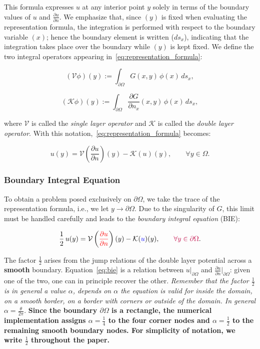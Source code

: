 \documentclass[11pt,onecolumn]{article}
\begin{document}
This formula expresses $u$ at any interior point $y$ solely in terms of the boundary values of $u$ and $\frac{\partial u}{\partial n}$. We emphasize that, since $(y)$ is fixed when evaluating the representation formula, the integration is performed with respect to the boundary variable $(x)$; hence the boundary element is written ($ds_{x}$), indicating that the integration takes place over the boundary while $(y)$ is kept fixed. We define the two integral operators appearing in~\eqref{eq:representation_formula}:

\begin{equation}
(\mathcal{V}\phi)(y) := \int_{\partial\Omega} G(x,y)\, \phi(x)\, ds_x,
\label{eq:single_layer}
\end{equation}

\begin{equation}
(\mathcal{K}\phi)(y) := \int_{\partial\Omega} \frac{\partial G}{\partial n_x}(x,y)\, \phi(x)\, ds_x,
\label{eq:double_layer}
\end{equation}

where $\mathcal{V}$ is called the \textit{single layer operator} and $\mathcal{K}$ is called the \textit{double layer operator}. With this notation,~\eqref{eq:representation_formula} becomes:

\begin{equation}
u(y) = \mathcal{V}\left(\frac{\partial u}{\partial n}\right)(y) - \mathcal{K}(u)(y), \qquad \forall y \in \Omega.
\end{equation}

\subsubsection{Boundary Integral Equation}
To obtain a problem posed exclusively on $\partial\Omega$, we take the trace of the representation formula, i.e., we let $y \to \partial\Omega$. Due to the singularity of $G$, this limit must be handled carefully and leads to the \textit{boundary integral equation} (BIE):

\begin{equation}
\frac{1}{2}\,u(y) = \mathcal{V}\left({\color{red}\frac{\partial u}{\partial n}}\right)(y) - \mathcal{K}({\color{blue}u})(y), 
\qquad{\color{purple} \forall y \in \partial\Omega}.
\label{eq:bie}
\end{equation}

The factor $\frac{1}{2}$ arises from the jump relations of the double layer potential across a \textbf{smooth} boundary. Equation~\eqref{eq:bie} is a relation between $u|_{\partial\Omega}$ and $\frac{\partial u}{\partial n}|_{\partial\Omega}$: given one of the two, one can in principle recover the other. \textit{Remember that the factor $\frac{1}{2}$ is in general a value $\alpha$, depends on $\alpha$ the equation is valid for inside the domain, on a smooth border, on a border with corners or outside of the domain. In general $\alpha = \frac{\theta}{2\pi}$}. \textbf{Since the boundary $\partial\Omega$ is a rectangle, the numerical implementation assigns $\alpha = \frac{1}{4}$ to the four corner nodes and $\alpha = \frac{1}{2}$ to the remaining smooth boundary nodes. For simplicity of notation, we write $\frac{1}{2}$ throughout the paper.}
\end{document}
